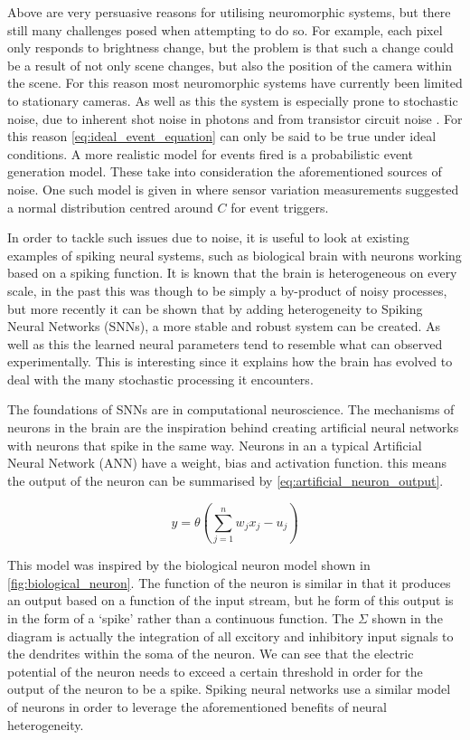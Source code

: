 Above are very persuasive reasons for utilising neuromorphic systems, but there still many challenges posed when attempting to do so. For example, each pixel only responds to brightness change, but the problem is that such a change could be a result of not only scene changes, but also the position of the camera within the scene. For this reason most neuromorphic systems have currently been limited to stationary cameras. As well as this the system is especially prone to stochastic noise, due to inherent shot noise in photons and from transistor circuit noise \cite{EventBasedVisionASurvery}. For this reason \autoref{eq:ideal_event_equation} can only be said to be true under ideal conditions. A more realistic model for events fired is a probabilistic event generation model. These take into consideration the aforementioned sources of noise. One such model is given in \cite{NonIdealEventCamera} where sensor variation measurements suggested a normal distribution centred around $ C $ for event triggers.

In order to tackle such issues due to noise, it is useful to look at existing examples of spiking neural systems, such as biological brain with neurons working based on a spiking function. It is known that the brain is heterogeneous on every scale, in the past this was though to be simply a by-product of noisy processes, but more recently it can be shown that by adding heterogeneity to Spiking Neural Networks (SNNs), a more stable and robust system can be created\cite{NeuralHetroPromRobLearn}. As well as this the learned neural parameters tend to resemble what can observed experimentally. This is interesting since it explains how the brain has evolved to deal with the many stochastic processing it encounters.

The foundations of SNNs are in computational neuroscience. The mechanisms of neurons in the brain are the inspiration behind creating artificial neural networks with neurons that spike in the same way. Neurons in an a typical Artificial Neural Network (ANN) have a weight, bias and activation function. this means the output of the neuron can be summarised by \autoref{eq:artificial_neuron_output}.

\begin{equation}
      y = \theta(\sum^n_{j=1}w_jx_j-u_j)
      \label{eq:artificial_neuron_output}
\end{equation}

This model was inspired by the biological neuron model shown in \autoref{fig:biological_neuron}. The function of the neuron is similar in that it produces an output based on a function of the input stream, but he form of this output is in the form of a `spike' rather than a continuous function. The $ \Sigma $ shown in the diagram is actually the integration of all excitory and inhibitory input signals to the dendrites within the soma of the neuron. We can see that the electric potential of the neuron needs to exceed a certain threshold in order for the output of the neuron to be a spike. Spiking neural networks use a similar model of neurons in order to leverage the aforementioned benefits of neural heterogeneity.

